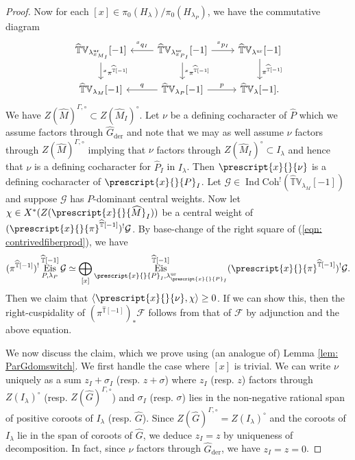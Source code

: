 \documentclass{amsart}
\theoremstyle{definition}
\theoremstyle{remark}
\numberwithin{equation}{section}
\DeclareMathOperator{\Ind}{Ind}
\newcommand{\der}{\mathrm{der}}
\newcommand{\mc}{\mathcal}
\newcommand{\co}[1]{\prescript{#1}{}}
\newcommand{\wh}{\widehat}
\DeclareMathOperator{\Eis}{\mathrm{Eis}}
\newcommand{\Coh}{\mathrm{Coh}}
\newcommand{\ur}{\mathrm{ur}}
\newcommand{\V}{\mathbb{V}}
\newcommand{\T}{\mathbb{T}}
\begin{document}
\begin{proof}
Now for each $[x] \in \pi_0(H_{\lambda}) / \pi_0(H_{\lambda_P})$, we have the commutative diagram
\begin{equation}{\label{eqn: contrivedfiberprod}}
    \begin{tikzcd}
    \wh{\T}\V_{\lambda_{\co{x}{M}_I}^{\ur}}[-1] \arrow[d, "\co{x}{\pi}^{\wh{\T}[-1]}"] & \wh{\T}\V_{\lambda_{\co{x}{P}_I}^{\ur}}[-1] \arrow[r, "\co{x}{p}_I"] \arrow[d, "\co{x}{\pi}^{\wh{\T}[-1]}"] \arrow[l, swap, "\co{x}{q}_I "] & \wh{\T}\V_{\lambda^{\ur}}[-1] \arrow[d, "\pi^{\wh{\T}[-1]}"] \\
    \wh{\T}\V_{\lambda_M}[-1]  & \arrow[l, swap, "q"] \wh{\T}\V_{\lambda_P}[-1] \arrow[r, "p"] & \wh{\T}\V_{\lambda}[-1].
\end{tikzcd}
\end{equation}
 We have $Z(\wh{M})^{\Gamma, \circ} \subset Z(\wh{M}_I)^{\circ}$. Let $\nu$ be a defining cocharacter of $\wh{P}$ which we assume factors through $\wh{G}_{\der}$ and note that we may as well assume $\nu$ factors through $Z(\wh{M})^{\Gamma, \circ}$ implying that $\nu$ factors through $Z(\wh{M}_I)^{\circ} \subset I_{\lambda}$ and hence that $\nu$ is a defining cocharacter for $\wh{P}_I$ in $I_{\lambda}$. Then $\co{x}{\nu}$ is a defining cocharacter of $\co{x}{P}_I$. Let $\mc{G} \in \Ind\wh{\Coh}{}^!(\wh{\T}\V_{\lambda_M}[-1])$ and suppose $\mc{G}$ has $P$-dominant central weights. Now let $\chi \in X^{\ast}(Z(\co{x}{\wh M}_I))$ be a central weight of $(\co{x}{\pi}^{\wh{\T}[-1]})^!\mc{G}$. By base-change of the right square of (\ref{eqn: contrivedfiberprod}), we have 
\begin{equation*}
     (\pi^{\wh{\T}[-1]})^!\Eis^{\wh{\T}[-1]}_{P,\lambda_P}\mc{G} \simeq \bigoplus\limits_{[x]} \Eis^{\wh{\T}[-1]}_{\co{x}{P}_I, \lambda^\ur_{\co{x}{P}_I}}(\co{x}{\pi}^{\wh{\T}[-1]})^!\mc{G}.
\end{equation*}
Then we claim that $\langle \co{x}{\nu}, \chi\rangle \geq 0$. If we can show this, then the right-cuspidality of $(\pi^{\wh{\T}[-1]})_* \mc F$ follows from that of $\mc F$ by adjunction and the above equation.


We now discuss the claim, which we prove using (an analogue of) Lemma \ref{lem: ParGdomswitch}. We first handle the case where $[x]$ is trivial. We can write $\nu$ uniquely as a sum $z_I + \sigma_I$ (resp. $z + \sigma$) where $z_I$ (resp. $z$) factors through $Z(I_{\lambda})^{\circ}$ (resp. $Z(\wh{G})^{\Gamma, \circ}$) and $\sigma_I$ (resp. $\sigma$) lies in the non-negative rational span of positive coroots of $I_{\lambda}$ (resp. $\wh{G}$). Since $Z(\wh{G})^{\Gamma, \circ} = Z(I_{\lambda})^{\circ}$ and the coroots of $I_{\lambda}$ lie in the span of coroots of $\wh{G}$, we deduce $z_I = z$ by uniqueness of decomposition. In fact, since $\nu$ factors through $\wh G_\der$, we have $z_I=z=0$.


\end{proof}
\end{document}
